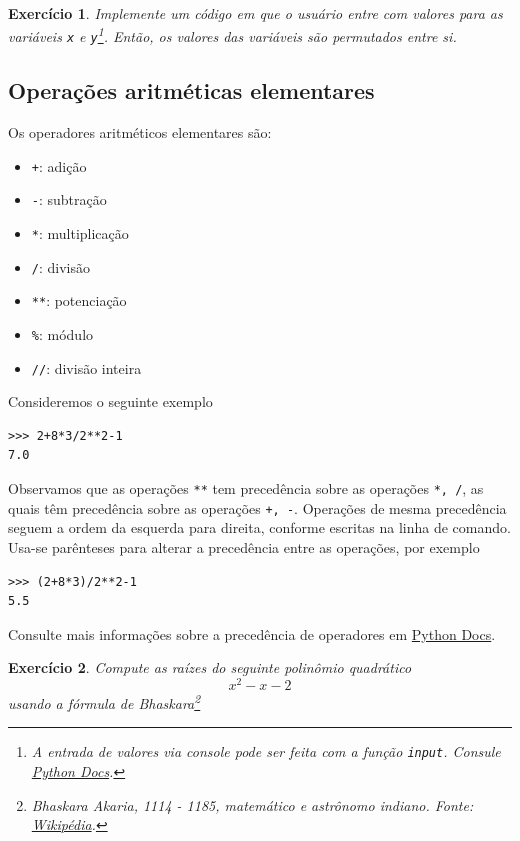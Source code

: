 \documentclass[12pt]{article}
\newtheorem{exr}{Exercício}[section]
\begin{document}
\begin{exr}
  Implemente um código em que o usuário entre com valores para as variáveis \lstinline+x+ e \lstinline+y+\footnote{A entrada de valores via console pode ser feita com a função {\python} \lstinline+input+. Consule \href{https://docs.python.org/3/library/functions.html\#input}{Python Docs}.}. Então, os valores das variáveis são permutados entre si.
\end{exr}


\subsection{Operações aritméticas elementares}

Os operadores aritméticos elementares são:
\begin{itemize}
\item[]\lstinline-+-: adição
\item[]\lstinline+-+: subtração
\item[]\lstinline+*+: multiplicação
\item[]\lstinline+/+: divisão
\item[]\lstinline+**+: potenciação
\item[]\lstinline+%+: módulo
\item[]\lstinline+//+: divisão inteira
\end{itemize}

Consideremos o seguinte exemplo
\begin{lstlisting}
>>> 2+8*3/2**2-1
7.0
\end{lstlisting}
Observamos que as operações \lstinline+**+ tem precedência sobre as operações \lstinline+*, /+, as quais têm precedência sobre as operações \lstinline!+, -!. Operações de mesma precedência seguem a ordem da esquerda para direita, conforme escritas na linha de comando. Usa-se parênteses para alterar a precedência entre as operações, por exemplo
\begin{lstlisting}
>>> (2+8*3)/2**2-1
5.5
\end{lstlisting}
Consulte mais informações sobre a precedência de operadores em \href{https://docs.python.org/3/reference/expressions.html#operator-precedence}{Python Docs}.

\begin{exr}
  Compute as raízes do seguinte polinômio quadrático
  \begin{equation}
    x^2 - x - 2
  \end{equation}
  usando a fórmula de Bhaskara\footnote{Bhaskara Akaria, 1114 - 1185, matemático e astrônomo indiano. Fonte: \href{https://pt.wikipedia.org/wiki/Bhaskara\_II}{Wikipédia}.}
\end{exr}
\end{document}
